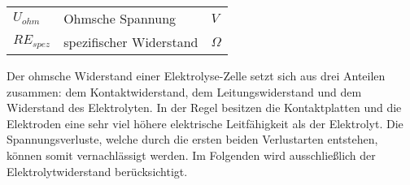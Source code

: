 \documentclass[onecolumn,10pt,titlepage]{article}
\begin{document}
			\begin{table}[H]
				\begin{tabular*}{\textwidth}{lll}
					$U_{ohm}$&Ohmsche Spannung&$V$\\
					$RE_{spez}$&spezifischer Widerstand&$\Omega$\\
				\end{tabular*}
			\end{table}

			Der ohmsche Widerstand einer Elektrolyse-Zelle setzt sich aus drei Anteilen zusammen: dem Kontaktwiderstand, dem Leitungswiderstand und dem Widerstand des Elektrolyten. In der Regel besitzen die Kontaktplatten und die Elektroden eine sehr viel höhere elektrische Leitfähigkeit als der Elektrolyt. Die Spannungsverluste, welche durch die ersten beiden Verlustarten entstehen, können somit vernachlässigt werden. Im Folgenden wird ausschließlich der Elektrolytwiderstand berücksichtigt.\cite{NI.2007}
\end{document}
